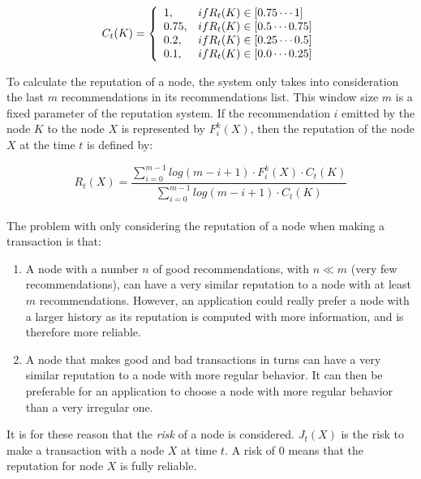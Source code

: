 \begin{equation}
  C_t (K) = \left\{
  \begin{array}{l l}
    1, & if R_t(K) \in [0.75 \cdots 1]\\
    0.75, & if R_t(K) \in [0.5 \cdots 0.75]\\
    0.2,  & if R_t(K) \in [0.25 \cdots 0.5]\\
    0.1, & if R_t(K) \in [0.0 \cdots 0.25]\\
  \end{array}\right.
\end{equation}

To calculate the reputation of a node, the system only takes into consideration
the last $m$ recommendations in its recommendations list. This window size $m$ is
a fixed parameter of the reputation system. If the recommendation  $i$ emitted
by the node $K$ to the node $X$ is represented by $F_i^k (X)$, then the
reputation of the node $X$ at the time $t$ is defined by:

\begin{equation}
  R_t(X) = \frac{\sum_{i=0}^{m-1}  log(m-i+1) \cdot F_i^k(X) \cdot C_t(K)}{
\sum_{i=0}^{m-1} log(m-i+1) \cdot C_t(K)}
\end{equation}\\


The problem with only considering the reputation of a node when making a
transaction is that:
\begin{enumerate}
  \item A node with a number $n$ of good recommendations, with $n \ll m$ (very
few recommendations), can have a very similar reputation to a node with at
least $m$ recommendations. However, an application could really prefer a node
with a larger history as its reputation is computed with more information, and
is therefore more reliable.
  \item A node that makes good and bad transactions in turns can have a very
similar reputation to a node with more regular behavior. It can then be
preferable for an application to choose a node with more regular
behavior than a very irregular one.

\end{enumerate}

It is for these reason that the \textit{risk} of a node is considered. $J_t(X)$ is
the risk to make a transaction with a node $X$ at time $t$. A risk of 0
means that the reputation for node $X$ is fully reliable.

